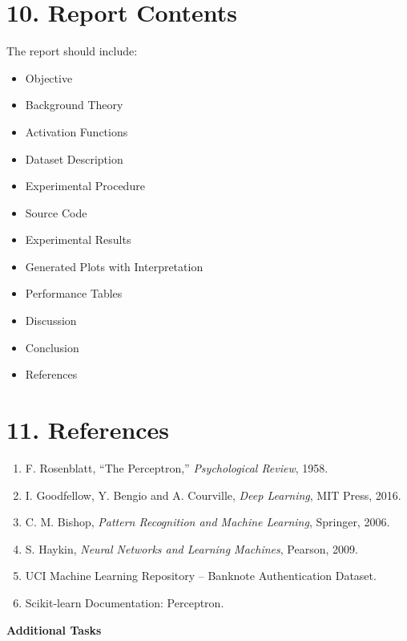 \documentclass[11pt]{article}
\begin{document}
\section*{10. Report Contents}

The report should include:

\begin{itemize}
\item Objective
\item Background Theory
\item Activation Functions
\item Dataset Description
\item Experimental Procedure
\item Source Code
\item Experimental Results
\item Generated Plots with Interpretation
\item Performance Tables
\item Discussion
\item Conclusion
\item References
\end{itemize}


\section*{11. References}

\begin{enumerate}
\item F. Rosenblatt, ``The Perceptron,'' \emph{Psychological Review}, 1958.
\item I. Goodfellow, Y. Bengio and A. Courville, \emph{Deep Learning}, MIT Press, 2016.
\item C. M. Bishop, \emph{Pattern Recognition and Machine Learning}, Springer, 2006.
\item S. Haykin, \emph{Neural Networks and Learning Machines}, Pearson, 2009.
\item UCI Machine Learning Repository -- Banknote Authentication Dataset.
\item Scikit-learn Documentation: Perceptron.
\end{enumerate}



\begin{center}
    {\Huge \textbf{Additional Tasks }}
\end{center}
\end{document}
